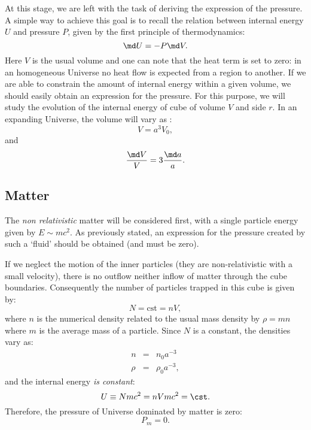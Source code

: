 At this stage, we are left with the task of deriving the expression of the pressure. A simple way to achieve this goal is to recall the relation between internal energy $U$ and pressure $P$, given by the first principle of thermodynamics:
\begin{equation}
	\md U=-P\md V.
\end{equation}
Here $V$ is the usual volume and one can note that the heat term is set to zero: in an homogeneous Universe no heat flow is expected from a region to another. If we are able to constrain the amount of internal energy within a given volume, we should easily obtain an expression for the pressure. For this purpose, we will study the evolution of the internal energy of cube of volume $V$ and side $r$. In an expanding Universe, the volume will vary as :
\begin{equation}
	V=a^3 V_0,
\end{equation}
and 
\begin{equation}
	\frac{\md V}{V}=3\frac{\md a}{a}.
\end{equation}

\subsection{Matter} %
\label{sub:matter}
 The \emph{non relativistic} matter will be considered first, with a single particle energy given by $E\sim mc^2$. As previously stated, an expression for the pressure created by such a `fluid' should be obtained (and must be zero).
 
If we neglect the motion of the inner particles (they are non-relativistic with a small velocity), there is no outflow neither inflow of matter through the cube boundaries. Consequently the number of particles trapped in this cube is given by:
\begin{equation}
	N=\mathrm{cst}=nV,
\end{equation}
where $n$ is the numerical density related to the usual mass density by $\rho=mn$ where $m$ is the average mass of a particle. Since $N$ is a constant, the densities vary as:
\begin{eqnarray}
	n&=&n_0 a^{-3}\\
	\rho&=&\rho_0 a^{-3},
\end{eqnarray}
and the internal energy \emph{is constant}:
\begin{equation}
	U\equiv Nmc^2=nVmc^2=\cst.
\end{equation}
Therefore, the pressure of Universe dominated by matter is zero:
\begin{equation}
	P_m=0.
\end{equation}

